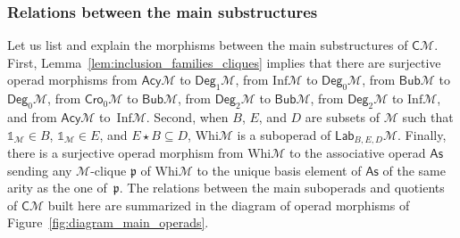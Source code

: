 \documentclass[10pt,reqno]{amsart}
\numberwithin{equation}{subsection}
\newcommand{\Mca}{\mathcal{M}}
\newcommand{\Pfr}{\mathfrak{p}}
\newcommand{\As}{\mathsf{As}}
\newcommand{\Cli}{\mathsf{C}}
\newcommand{\Lab}{\mathsf{Lab}}
\newcommand{\Bub}{\mathsf{Bub}}
\newcommand{\Deg}{\mathsf{Deg}}
\newcommand{\Cro}{\mathsf{Cro}}
\newcommand{\Acy}{\mathsf{Acy}}
\newcommand{\Whi}{\mathrm{Whi}}
\newcommand{\Inf}{\mathrm{Inf}}
\newcommand{\Unit}{\mathds{1}}
\newcommand{\Op}{\star}
\begin{document}
\subsubsection{Relations between the main substructures}
Let us list and explain the morphisms between the main substructures of
$\Cli\Mca$. First, Lemma~\ref{lem:inclusion_families_cliques} implies
that there are surjective operad morphisms from $\Acy\Mca$ to
$\Deg_1\Mca$, from $\Inf\Mca$ to $\Deg_0\Mca$, from $\Bub\Mca$ to
$\Deg_0\Mca$, from $\Cro_0\Mca$ to $\Bub\Mca$, from $\Deg_2\Mca$ to
$\Bub\Mca$, from $\Deg_2\Mca$ to $\Inf\Mca$, and from $\Acy\Mca$
to~$\Inf\Mca$. Second, when $B$, $E$, and $D$ are subsets of $\Mca$ such
that $\Unit_\Mca \in B$, $\Unit_\Mca \in E$, and $E \Op B \subseteq D$,
$\Whi\Mca$ is a suboperad of $\Lab_{B,E,D}\Mca$. Finally, there is a
surjective operad morphism from $\Whi\Mca$ to the associative operad
$\As$ sending any $\Mca$-clique $\Pfr$ of $\Whi\Mca$ to the unique basis
element of $\As$ of the same arity as the one of~$\Pfr$. The relations
between the main suboperads and quotients of $\Cli\Mca$ built here are
summarized in the diagram of operad morphisms of
Figure~\ref{fig:diagram_main_operads}.
\end{document}
